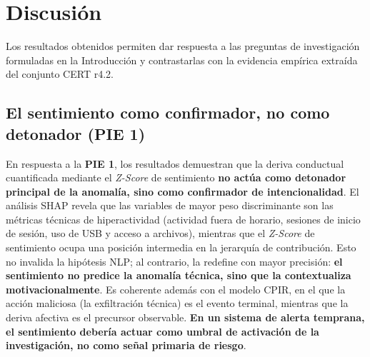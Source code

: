 \documentclass[IB]{TFUOC}%
\begin{document}



\chapter{Discusión}

Los resultados obtenidos permiten dar respuesta a las preguntas de investigación 
formuladas en la Introducción y contrastarlas con la evidencia empírica extraída 
del conjunto CERT r4.2.

\section{El sentimiento como confirmador, no como detonador (PIE 1)}

En respuesta a la \textbf{PIE 1}, los resultados demuestran que la deriva 
conductual cuantificada mediante el \textit{Z-Score} de sentimiento \textbf{no 
actúa como detonador principal de la anomalía, sino como confirmador de 
intencionalidad}. El análisis SHAP revela que las variables de mayor peso discriminante son las métricas técnicas de hiperactividad (actividad fuera de horario, sesiones de inicio de sesión, uso de USB y acceso a archivos), mientras que el \textit{Z-Score} de sentimiento ocupa una posición intermedia en la jerarquía de contribución. Esto no invalida la hipótesis NLP; al contrario, la redefine con mayor precisión: \textbf{el sentimiento no predice la anomalía técnica, sino que la contextualiza motivacionalmente}. Es coherente además con el modelo CPIR, en el que la acción maliciosa (la exfiltración técnica) es el evento terminal, mientras que la deriva afectiva es el precursor observable. \textbf{En un sistema de alerta temprana, el sentimiento debería actuar como umbral de activación de la investigación, no como señal primaria de riesgo}.
\end{document}
